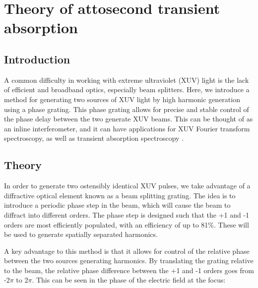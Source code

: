 \chapter{Theory of attosecond transient absorption}
\label{atas_theory}

\section{Introduction}
\label{intro_atas_theory}

A common difficulty in working with extreme ultraviolet (XUV) light is the lack of efficient and broadband optics, especially beam splitters. Here, we introduce a method for generating two sources of XUV light by high harmonic generation using a phase grating.  This phase grating allows for precise and stable control of the phase delay between the two generate XUV beams.  This can be thought of as an inline interferometer, and it can have applications for XUV Fourier transform spectroscopy, as well as transient absorption spectroscopy \cite{diffuse}.

\section{Theory}
\label{theory_ts}

In order to generate two ostensibly identical XUV pulses, we take advantage of a diffractive optical element known as a beam splitting grating.   The idea is to introduce a periodic phase step in the beam, which will cause the beam to diffract into different orders.  The phase step is designed such that the +1 and -1 orders are most efficiently populated, with an efficiency of up to 81$\%$.  These will be used to generate spatially separated harmonics.

A key advantage to this method is that it allows for control of the relative phase between the two sources generating harmonics.  By translating the grating relative to the beam, the relative phase difference between the +1 and -1 orders goes from -2$\pi$ to 2$\pi$.  This can be seen in the phase of the electric field at the focus:




